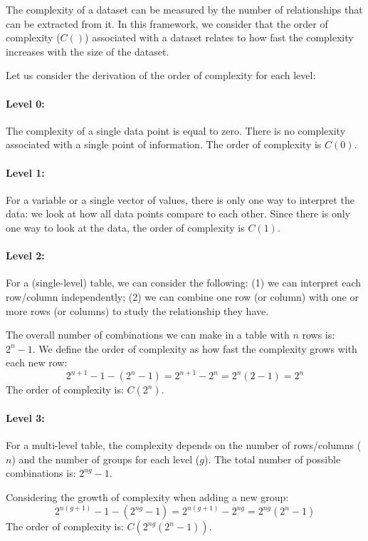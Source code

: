 \documentclass[12pt,a4paper]{article}
\begin{document}
The complexity of a dataset can be measured by the number of relationships that can be extracted from it. In this framework, we consider that the order of complexity ($C()$) associated with a dataset relates to how fast the complexity increases with the size of the dataset.

Let us consider the derivation of the order of complexity for each level:

\paragraph{Level 0:}
The complexity of a single data point is equal to zero. There is no complexity associated with a single point of information. The order of complexity is $C(0)$.

\paragraph{Level 1:}
For a variable or a single vector of values, there is only one way to interpret the data: we look at how all data points compare to each other. Since there is only one way to look at the data, the order of complexity is $C(1)$.

\paragraph{Level 2:}
For a (single-level) table, we can consider the following: (1) we can interpret each row/column independently; (2) we can combine one row (or column) with one or more rows (or columns) to study the relationship they have.

The overall number of combinations we can make in a table with $n$ rows is: $2^n - 1$. We define the order of complexity as how fast the complexity grows with each new row:
\begin{equation}
2^{n+1} - 1 - (2^n - 1) = 2^{n+1} - 2^n = 2^n (2 - 1) = 2^n
\end{equation}
The order of complexity is: $C(2^n)$.

\paragraph{Level 3:}
For a multi-level table, the complexity depends on the number of rows/columns ($n$) and the number of groups for each level ($g$). The total number of possible combinations is: $2^{ng} - 1$.

Considering the growth of complexity when adding a new group:
\begin{equation}
2^{n(g+1)} - 1 - (2^{ng} - 1) = 2^{n(g+1)} - 2^{ng} = 2^{ng} (2^n - 1)
\end{equation}
The order of complexity is: $C(2^{ng}(2^n - 1))$.
\end{document}
